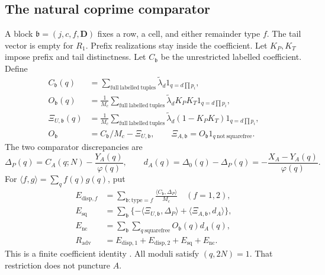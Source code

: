 \subsection{The natural coprime comparator}

A block $\mathfrak b=(j,c,f,\mathbf D)$ fixes a row,
a cell, and either remainder type $f$.
The tail vector is empty for $R_1$.
Prefix realizations stay inside the coefficient.
Let $K_P,K_T$ impose prefix and tail distinctness.
Let $C_{\mathfrak b}$ be the unrestricted labelled coefficient.
Define
\begin{equation}\label{eq:l3-masks}
\begin{aligned}
 C_{\mathfrak b}(q)&=\sum_{\mathrm{full\ labelled\ tuples}}
          \widetilde\lambda_d1_{q=d\prod p_i},\\
 O_{\mathfrak b}(q)&=\frac1{M_c}
      \sum_{\mathrm{full\ labelled\ tuples}}
          \widetilde\lambda_dK_PK_T1_{q=d\prod p_i},\\
 \Xi_{U,\mathfrak b}(q)&=\frac1{M_c}
      \sum_{\mathrm{full\ labelled\ tuples}}
          \widetilde\lambda_d(1-K_PK_T)1_{q=d\prod p_i},\\
 O_{\mathfrak b}&=C_{\mathfrak b}/M_c-\Xi_{U,\mathfrak b},\qquad
 \Xi_{A,\mathfrak b}=O_{\mathfrak b}1_{q\ \mathrm{not\ squarefree}}.
\end{aligned}
\end{equation}
The two comparator discrepancies are
\begin{equation}\label{eq:l3-comparator}
 \Delta_P(q)=C_A(q;N)-\frac{Y_A(q)}{\varphi(q)},\qquad
 d_A(q)=\Delta_0(q)-\Delta_P(q)
             =-\frac{X_A-Y_A(q)}{\varphi(q)}.
\end{equation}
For $\langle f,g\rangle=\sum_qf(q)g(q)$, put
\begin{equation}\label{eq:l3-adv-split}
\begin{aligned}
 E_{\mathrm{disp},f}&=\sum_{\mathfrak b:\mathrm{type}=f}
                \frac{\langle C_{\mathfrak b},\Delta_P\rangle}{M_c}
                     \quad(f=1,2),\\
 E_{\mathrm{sq}}&=\sum_{\mathfrak b}
       \{-\langle\Xi_{U,\mathfrak b},\Delta_P\rangle
                         +\langle\Xi_{A,\mathfrak b},d_A\rangle\},\\
 E_{\mathrm{nc}}&=\sum_{\mathfrak b}\sum_{q\ \mathrm{squarefree}}
                              O_{\mathfrak b}(q)d_A(q),\\
 R_{\mathrm{adv}}&=E_{\mathrm{disp},1}+E_{\mathrm{disp},2}
                                      +E_{\mathrm{sq}}+E_{\mathrm{nc}}.
\end{aligned}
\end{equation}
This is a finite coefficient identity
\cite[(4.22)--(4.26), Appendix~B.1--B.4]{PaperII}.
All moduli satisfy $(q,2N)=1$.
That restriction does not puncture $A$.

